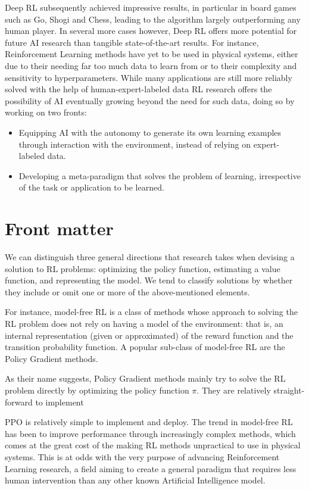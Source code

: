 \documentclass[review]{elsarticle}
\begin{document}
Deep RL subsequently achieved impressive results, in particular in board games such as Go, Shogi and Chess, leading to the algorithm largely outperforming any human player. In several more cases however, Deep RL offers more potential for future AI research than tangible state-of-the-art results. For instance, Reinforcement Learning methods have yet to be used in physical systems, either due to their needing far too much data to learn from %
or to their complexity and sensitivity to hyperparameters. %
While many applications are still more reliably solved with the help of human-expert-labeled data %
RL research offers the possibility of AI eventually growing beyond the need for such data, doing so by working on two fronts:
\begin{itemize}
\item Equipping AI with the autonomy to generate its own learning examples through interaction with the environment, instead of relying on expert-labeled data.
\item Developing a meta-paradigm that solves the problem of learning, irrespective of the task or application to be learned.
\end{itemize}


\section{Front matter}

We can distinguish three general directions that research takes when devising a solution to RL problems: optimizing the policy function, estimating a value function, and representing the model. We tend to classify solutions by whether they include or omit one or more of the above-mentioned elements.

For instance, model-free RL is a class of methods whose approach to solving the RL problem does not rely on having a model of the environment: that is, an internal representation (given or approximated) of the reward function and the transition probability function. A popular sub-class of model-free RL are the Policy Gradient methods.

As their name suggests, Policy Gradient methods mainly try to solve the RL problem directly by optimizing the policy function $\pi$. They are relatively straight-forward to implement 


PPO is relatively simple to implement and deploy. The trend in model-free RL has been to improve performance through increasingly complex methods, which comes at the great cost of the making RL methods unpractical to use in physical systems. This is at odds with the very purpose of advancing Reinforcement Learning research, a field aiming to create a general paradigm that requires less human intervention than any other known Artificial Intelligence model.
\end{document}
